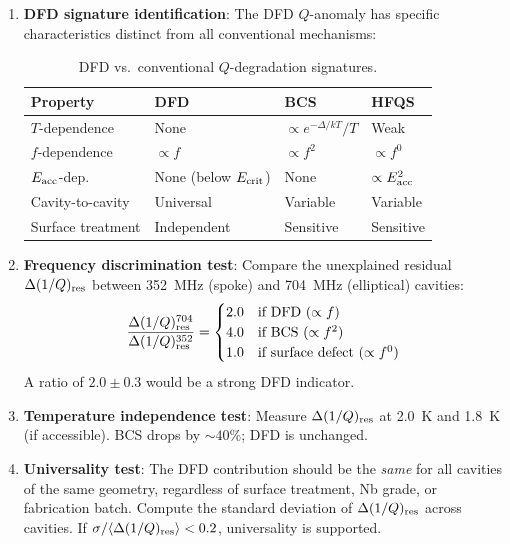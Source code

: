 \documentclass[11pt]{article}
\begin{document}
\begin{enumerate}
\item \textbf{DFD signature identification}: The DFD $Q$-anomaly has
  specific characteristics distinct from all conventional mechanisms:

  \begin{table}[H]
  \centering
  \caption{DFD vs.\ conventional $Q$-degradation signatures.}
  \label{tab:signatures}
  \begin{tabular}{p{3cm}p{3cm}p{3cm}p{3cm}}
  \toprule
  \textbf{Property} & \textbf{DFD} & \textbf{BCS} & \textbf{HFQS} \\
  \midrule
  $T$-dependence & None & $\propto e^{-\Delta/kT}/T$ & Weak \\
  $f$-dependence & $\propto f$ & $\propto f^2$ & $\propto f^0$ \\
  $E_{\rm acc}$-dep. & None (below $E_{\rm crit}$) &
    None & $\propto E_{\rm acc}^2$ \\
  Cavity-to-cavity & Universal & Variable & Variable \\
  Surface treatment & Independent & Sensitive & Sensitive \\
  \bottomrule
  \end{tabular}
  \end{table}

\item \textbf{Frequency discrimination test}: Compare the unexplained
  residual $\Delta(1/Q)_{\rm res}$ between 352~MHz (spoke) and 704~MHz
  (elliptical) cavities:
  \begin{equation}
  \frac{\Delta(1/Q)_{\rm res}^{704}}{\Delta(1/Q)_{\rm res}^{352}}
  = \begin{cases}
  2.0 & \text{if DFD ($\propto f$)} \\
  4.0 & \text{if BCS ($\propto f^2$)} \\
  1.0 & \text{if surface defect ($\propto f^0$)}
  \end{cases}
  \end{equation}
  A ratio of $2.0 \pm 0.3$ would be a strong DFD indicator.

\item \textbf{Temperature independence test}: Measure $\Delta(1/Q)_{\rm res}$
  at 2.0~K and 1.8~K (if accessible). BCS drops by $\sim 40\%$; DFD
  is unchanged.

\item \textbf{Universality test}: The DFD contribution should be the
  \emph{same} for all cavities of the same geometry, regardless of
  surface treatment, Nb grade, or fabrication batch. Compute the
  standard deviation of $\Delta(1/Q)_{\rm res}$ across cavities.
  If $\sigma/\langle\Delta(1/Q)_{\rm res}\rangle < 0.2$, universality
  is supported.
\end{enumerate}
\end{document}
